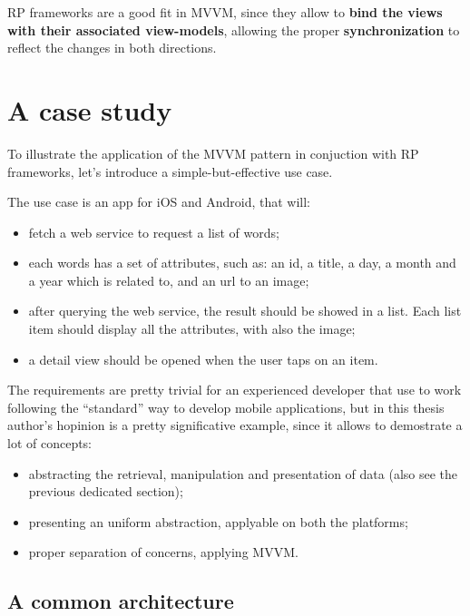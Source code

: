 RP frameworks are a good fit in MVVM, since they allow to \textbf{bind
the views with their associated view-models}, allowing the proper
\textbf{synchronization} to reflect the changes in both directions.

\section{A case study}\label{a-case-study}

To illustrate the application of the MVVM pattern in conjuction with RP
frameworks, let's introduce a simple-but-effective use case.

The use case is an app for iOS and Android, that will:

\begin{itemize}
\itemsep1pt\parskip0pt
\item
  fetch a web service to request a list of words;
\item
  each words has a set of attributes, such as: an id, a title, a day, a
  month and a year which is related to, and an url to an image;
\item
  after querying the web service, the result should be showed in a list.
  Each list item should display all the attributes, with also the image;
\item
  a detail view should be opened when the user taps on an item.
\end{itemize}

The requirements are pretty trivial for an experienced developer that
use to work following the ``standard'' way to develop mobile
applications, but in this thesis author's hopinion is a pretty
significative example, since it allows to demostrate a lot of concepts:

\begin{itemize}
\itemsep1pt\parskip0pt
\item
  abstracting the retrieval, manipulation and presentation of data (also
  see the previous dedicated section);
\item
  presenting an uniform abstraction, applyable on both the platforms;
\item
  proper separation of concerns, applying MVVM.
\end{itemize}


\subsection{A common architecture}\label{a-common-architecture}

